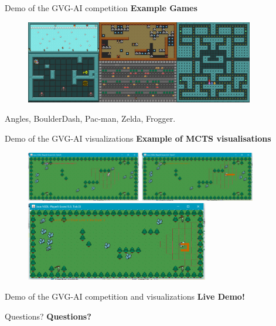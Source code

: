 \documentclass{beamer}
\begin{document}
\begin{frame}{Demo of the GVG-AI competition}
		\textbf{Example Games}
		\begin{figure}[t]
				\includegraphics[width=10cm]{VGDL}
		\end{figure} 
		Angles, BoulderDash, Pac-man, Zelda, Frogger.
		
\end{frame}

\begin{frame}{Demo of the GVG-AI visualizations}
		\textbf{Example of MCTS visualisations}
		\begin{figure}[t]
				\includegraphics[width=5cm]{Game-51-5}
				\includegraphics[width=5cm]{Game-51-6}
				\includegraphics[width=8cm]{Game-51-7}
		\end{figure} 
\end{frame}

\begin{frame}{Demo of the GVG-AI competition and visualizations}
\center
		\textbf{Live Demo!}
\end{frame}


\begin{frame}{Questions?}
\center
		\textbf{Questions?}
\end{frame}
\end{document}
